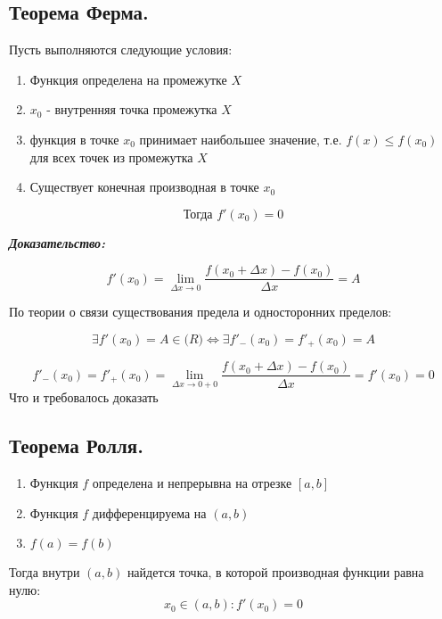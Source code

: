 \documentclass[a4paper,12pt]{article}
\theoremstyle{plain} %
\theoremstyle{definition} %
\theoremstyle{remark} %
\begin{document}
\newpage
\subsection*{Теорема Ферма.                                                                             }

Пусть выполняются следующие условия:

\begin{enumerate}
	\item Функция определена на промежутке $X$
	\item $x_0$ - внутренняя точка промежутка $X$
	\item функция в точке $x_0$ принимает наибольшее значение, т.е. $f(x) \leq f(x_0)$ для всех точек из промежутка $X$
	\item Существует конечная производная в точке $x_0$
\end{enumerate}
\[ \textbf{Тогда } f'(x_0) = 0 \]

\textit{\textbf{Доказательство:}}

\[
	f'(x_0) = \lim_{\Delta x \rightarrow 0} \frac{f(x_0 + \Delta x) - f(x_0)}{\Delta x} = A
\]

По теории о связи существования предела и односторонних пределов:

\[
	\exists f'(x_0) = A \in \mathbf(R) \Leftrightarrow \exists f'_-(x_0) = f'_+(x_0) = A
\]

\[
	f'_-(x_0) = f'_+(x_0) = \lim_{\Delta x \rightarrow 0 + 0} \frac{f(x_0 + \Delta x) - f(x_0)}{\Delta x} = f'(x_0) = 0
\]
Что и требовалось доказать


\newpage
\subsection*{Теорема Ролля.                                                                             }

\begin{enumerate}
	\item Функция $f$ определена и непрерывна на отрезке $[a, b]$
	\item Функция $f$ дифференцируема на $(a, b)$
	\item $f(a) = f(b)$
\end{enumerate}

Тогда внутри $(a, b)$ найдется точка, в которой производная функции равна нулю:
\[
	x_0 \in (a, b): f'(x_0) = 0
\]
\end{document}

